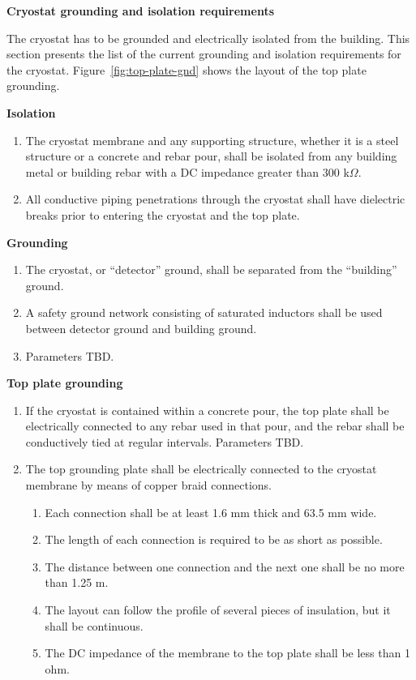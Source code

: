 \textbf{Cryostat grounding and isolation requirements}

The cryostat has to be grounded and electrically isolated from the building. %
This section presents the list of the current grounding and isolation requirements for the cryostat. 
Figure~\ref{fig:top-plate-gnd} shows the layout of the top plate grounding.

\textbf{Isolation}
\begin{enumerate}
\item The cryostat membrane and any supporting structure, whether it is a steel structure or a concrete and rebar pour, shall be isolated from any building metal or building rebar with a DC impedance greater than 300 k$\Omega$.
\item All conductive piping penetrations through the cryostat shall have dielectric breaks prior to entering the cryostat and the top plate.
\end{enumerate}

\textbf{Grounding}
\begin{enumerate}
\item The cryostat, or ``detector'' ground, shall be separated from the ``building'' ground.
\item A safety ground network consisting of saturated inductors shall be used between detector ground and building ground.
\item Parameters TBD.
\end{enumerate}

\textbf{Top plate grounding}
\begin{enumerate}
\item If the cryostat is contained within a concrete pour, the top plate shall be electrically connected to any rebar used in that pour, and the rebar shall be conductively tied at regular intervals. Parameters TBD.
\item The top grounding plate shall be electrically connected to the cryostat membrane by means of copper braid connections.
   \begin{enumerate}
   \item Each connection shall be at least 1.6 mm thick and 63.5 mm wide.
   \item The length of each connection is required to be as short as possible.
   \item The distance between one connection and the next one shall be no more than 1.25 m.
   \item The layout can follow the profile of several pieces of insulation, but it shall be continuous.
   \item The DC impedance of the membrane to the top plate shall be less than 1 ohm.
   \end{enumerate}
\end{enumerate}

